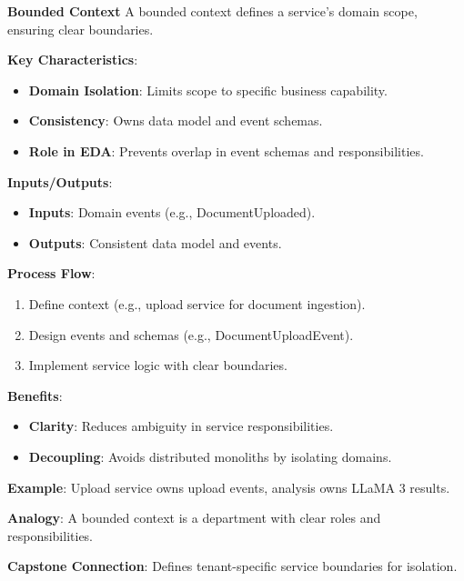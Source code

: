 \documentclass[11pt]{article}
\begin{document}
\begin{glossaryterm}
\textbf{Bounded Context}\newline
A bounded context defines a service’s domain scope, ensuring clear boundaries.

\textbf{Key Characteristics}:
\begin{itemize}
    \item \textbf{Domain Isolation}: Limits scope to specific business capability.
    \item \textbf{Consistency}: Owns data model and event schemas.
    \item \textbf{Role in EDA}: Prevents overlap in event schemas and responsibilities.
\end{itemize}

\textbf{Inputs/Outputs}:
\begin{itemize}
    \item \textbf{Inputs}: Domain events (e.g., DocumentUploaded).
    \item \textbf{Outputs}: Consistent data model and events.
\end{itemize}

\textbf{Process Flow}:
\begin{enumerate}
    \item Define context (e.g., upload service for document ingestion).
    \item Design events and schemas (e.g., DocumentUploadEvent).
    \item Implement service logic with clear boundaries.
\end{enumerate}

\textbf{Benefits}:
\begin{itemize}
    \item \textbf{Clarity}: Reduces ambiguity in service responsibilities.
    \item \textbf{Decoupling}: Avoids distributed monoliths by isolating domains.
\end{itemize}

\textbf{Example}: Upload service owns upload events, analysis owns LLaMA 3 results.

\textbf{Analogy}: A bounded context is a department with clear roles and responsibilities.

\textbf{Capstone Connection}: Defines tenant-specific service boundaries for isolation.
\end{glossaryterm}
\end{document}
